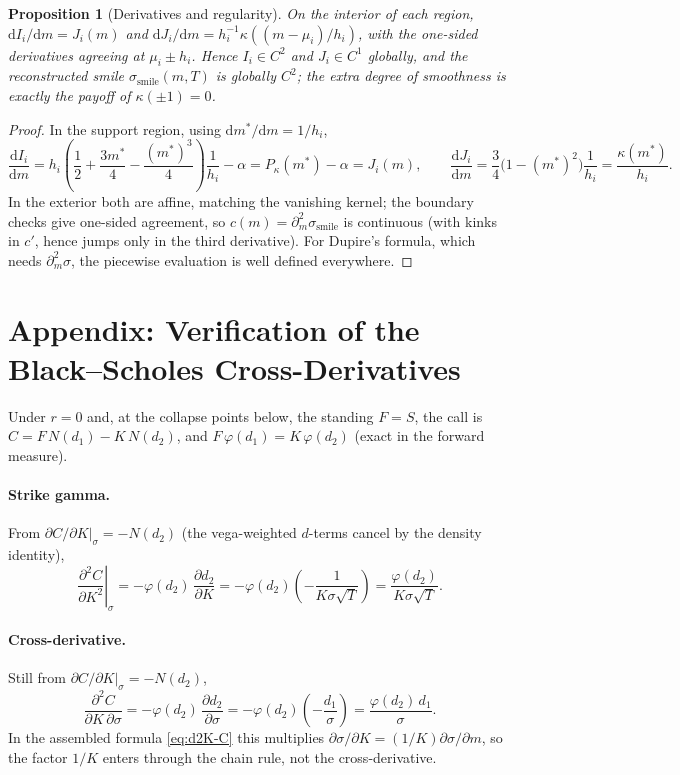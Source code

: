 \documentclass[11pt]{book}
\theoremstyle{plain}
\newtheorem{proposition}[theorem]{Proposition}
\theoremstyle{definition}
\theoremstyle{remark}
\newcommand{\mln}{m}                             %
\newcommand{\ssm}{\sigma_{\mathrm{smile}}}       %
\newcommand{\npdf}{\varphi}                      %
\newcommand{\ncdf}{N}                            %
\newcommand{\SigmaM}{\Sigma_M}                   %
\newcommand{\dd}{\mathrm{d}}                                  %
\newcommand{\pd}[2]{\frac{\partial #1}{\partial #2}}          %
\newcommand{\pdd}[2]{\frac{\partial^2 #1}{\partial #2^2}}     %
\newcommand{\pdc}[3]{\frac{\partial^2 #1}{\partial #2\,\partial #3}} %
\newcommand{\td}[2]{\frac{\dd #1}{\dd #2}}                    %
\newcommand{\atfixed}[2]{\left.#1\right|_{#2}}                %
\begin{document}
\begin{proposition}[Derivatives and regularity]\label{prop:derivatives}
On the interior of each region,
$\dd I_i/\dd\mln = J_i(\mln)$ and
$\dd J_i/\dd\mln = h_i^{-1}\kappa((\mln-\mu_i)/h_i)$, with the one-sided
derivatives agreeing at $\mu_i\pm h_i$. Hence $I_i \in C^2$ and $J_i \in C^1$
globally, and the reconstructed smile $\ssm(\mln,T)$ is globally $C^2$; the
extra degree of smoothness is exactly the payoff of $\kappa(\pm 1) = 0$.
\end{proposition}
\begin{proof}
In the support region, using $\dd\mln^*/\dd\mln = 1/h_i$,
\[
\td{I_i}{\mln} = h_i\!\left(\frac12 + \frac{3\mln^*}{4} - \frac{(\mln^*)^3}{4}
\right)\frac{1}{h_i} - \alpha = P_\kappa(\mln^*) - \alpha = J_i(\mln),
\qquad
\td{J_i}{\mln} = \frac34\bigl(1-(\mln^*)^2\bigr)\frac{1}{h_i}
= \frac{\kappa(\mln^*)}{h_i}.
\]
In the exterior both are affine, matching the vanishing kernel; the boundary
checks give one-sided agreement, so $c(\mln) = \partial_\mln^2\ssm$ is
continuous (with kinks in $c'$, hence jumps only in the third derivative). For
Dupire's formula, which needs $\partial_\mln^2\sigma$, the piecewise evaluation
is well defined everywhere.
\end{proof}

\section{Appendix: Verification of the Black--Scholes Cross-Derivatives}
\label{sec:bs-verify}

Under $r = 0$ and, at the collapse points below, the standing $F = S$, the call
is $C = F\,\ncdf(d_1) - K\,\ncdf(d_2)$, and $F\,\npdf(d_1) = K\,\npdf(d_2)$
(exact in the forward measure).

\paragraph{Strike gamma.} From $\partial C/\partial K|_\sigma = -\ncdf(d_2)$
(the vega-weighted $d$-terms cancel by the density identity),
\[
\atfixed{\pdd{C}{K}}{\sigma} = -\npdf(d_2)\,\pd{d_2}{K}
= -\npdf(d_2)\!\left(-\frac{1}{K\sigma\sqrt{T}}\right)
= \frac{\npdf(d_2)}{K\sigma\sqrt{T}}.
\]

\paragraph{Cross-derivative.} Still from
$\partial C/\partial K|_\sigma = -\ncdf(d_2)$,
\[
\pdc{C}{K}{\sigma} = -\npdf(d_2)\,\pd{d_2}{\sigma}
= -\npdf(d_2)\!\left(-\frac{d_1}{\sigma}\right)
= \frac{\npdf(d_2)\,d_1}{\sigma}.
\]
In the assembled formula \eqref{eq:d2K-C} this multiplies
$\partial\sigma/\partial K = (1/K)\partial\sigma/\partial\mln$, so the factor
$1/K$ enters through the chain rule, not the cross-derivative.
\end{document}
